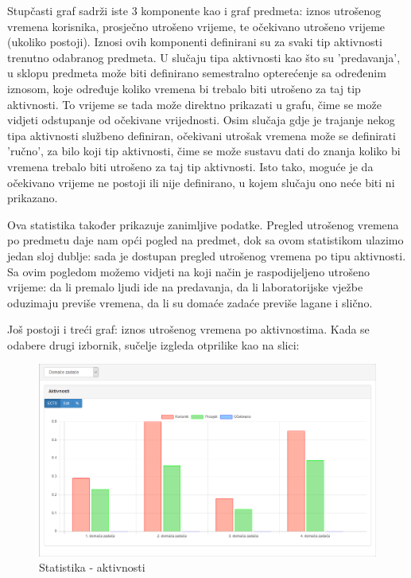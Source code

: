 \documentclass[times, utf8, zavrsni]{fer}
\begin{document}
Stupčasti graf sadrži iste 3 komponente kao i graf predmeta: iznos utrošenog vremena korisnika, prosječno utrošeno vrijeme, te očekivano utrošeno vrijeme (ukoliko postoji). Iznosi ovih komponenti definirani su za svaki tip aktivnosti trenutno odabranog predmeta. U slučaju tipa aktivnosti kao što su 'predavanja', u sklopu predmeta može biti definirano semestralno opterećenje sa određenim iznosom, koje određuje koliko vremena bi trebalo biti utrošeno za taj tip aktivnosti. To vrijeme se tada može direktno prikazati u grafu, čime se može vidjeti odstupanje od očekivane vrijednosti. Osim slučaja gdje je trajanje nekog tipa aktivnosti službeno definiran, očekivani utrošak vremena može se definirati 'ručno', za bilo koji tip aktivnosti, čime se može sustavu dati do znanja koliko bi vremena trebalo biti utrošeno za taj tip aktivnosti. Isto tako, moguće je da očekivano vrijeme ne postoji ili nije definirano, u kojem slučaju ono neće biti ni prikazano.

Ova statistika također prikazuje zanimljive podatke. Pregled utrošenog vremena po predmetu daje nam opći pogled na predmet, dok sa ovom statistikom ulazimo jedan sloj dublje: sada je dostupan pregled utrošenog vremena po tipu aktivnosti. Sa ovim pogledom možemo vidjeti na koji način je raspodijeljeno utrošeno vrijeme: da li premalo ljudi ide na predavanja, da li laboratorijske vježbe oduzimaju previše vremena, da li su domaće zadaće previše lagane i slično.

Još postoji i treći graf: iznos utrošenog vremena po aktivnostima. Kada se odabere drugi izbornik, sučelje izgleda otprilike kao na slici:

\begin{figure}[H]
\centering
\includegraphics[width=\textwidth,height=\textheight,keepaspectratio]{img/statistika-aktivnosti.png}
\caption{Statistika - aktivnosti}
\label{fig:statistika-aktivnosti}
\end{figure}
\end{document}
